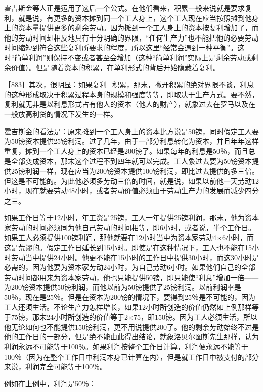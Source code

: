 霍吉斯金等人正是运用了这后一个公式。在他们看来，积累一般来说就是要求复利，就是说，有更多的资本摊到同一个工人身上，这个工人现在应当按照摊到他身上的资本量提供更多的剩余劳动。因为摊到一个工人身上的资本按复利增加了，而他的劳动时间却相反地具有十分明确的界限，“任何生产力”也不能把他的必要劳动时间缩短到符合这些复利所要求的程度，所以这里“经常会遇到一种平衡”。这时“简单利润”则保持不变或者甚至会增加（这种“简单利润”实际上是剩余劳动或剩余价值）。但是随着资本的积累，在单利形式的背后开始隐藏着复利。

［883］其次，很明显：如果复利=积累，那末，撇开积累的绝对界限不谈，利息的这种形成取决于积累过程本身的规模和强度等等，即取决于生产方式。要不然，复利就无非是以利息形式占有他人的资本（他人的财产），就象过去在罗马以及在一般放高利贷的情况下发生的一样。

霍吉斯金的看法是：原来摊到一个工人身上的资本比方说是50镑，同时假定工人要为50镑资本提供25镑利润。过了几年，由于一部分利息转化为资本，并且年年这样重复，摊到一个工人身上的资本已经是200镑了。如果每年的利息是50％，而且总是全部变成资本，那末这个过程不到四年就可以完成。工人象过去要为50镑资本提供25镑利润一样，现在应当为200镑资本提供100镑利润，即比过去提供的多三倍。但这是不可能的。为此他必须多劳动三倍的时间，就是说，如果以前他一天劳动12小时，现在就要劳动48小时，或者劳动价值必须由于劳动生产力的发展而减少四分之三。

如果工作日等于12小时，年工资是25镑，工人一年提供25镑利润，那末，他为资本家劳动的时间必须同为他自己劳动的时间相等，即6小时，或者说，半个工作日。如果工人必须提供100镑利润，那他就要在12小时当中为资本家劳动4×6小时，而这是荒谬的。假定工作日延长到15小时。即使是在这种情况下，工人也不能在15小时劳动当中提供24小时。他更不能在15小时的工作日中提供30小时，而这30小时是必需的，因为他要为资本家劳动24小时，为自己劳动6小时。如果他们自己的全部劳动时间都用来为资本家劳动，他也只能提供50镑，即只能使“利息”增加一倍——为200镑资本提供50镑利润，而他以前为50镑提供了25镑利润。以前利润率是50％，现在是25％。但是在资本为200镑的情况下，要得到25％是不可能的，因为工人还须生活。不论生产力怎样增长，如果12小时所创造的价值仍然如上例那样等于75镑，那末24小时所创造的价值等于2×75，即150镑。因为工人必须生活，所以他无论如何也不能提供150镑利润，更不用说提供200了。他的剩余劳动始终不过是他的工作日的一部分，但是绝不能由此得出结论，就象洛贝尔图斯先生那样，认为利润永远不可能等于100％。如果利润按整个工作日计算，利润便永远不能等于100％（因为在整个工作日中利润本身已计算在内），但是就工作日中被支付的部分来说，利润完全可能等于100％。

例如在上例中，利润是50％：

